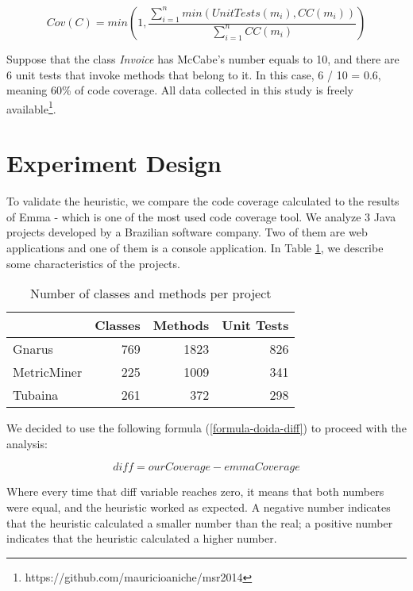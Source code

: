 \documentclass{sig-alternate}
\begin{document}
\begin{equation}
\label{formula-doida}
Cov(C) = min(1,\frac{\sum_{i=1}^{n}min(UnitTests(m_i), CC(m_i))}{\sum_{i=1}^{n}{CC(m_i)}})
\end{equation}

Suppose that the class \textit{Invoice} has McCabe's number equals to 10, 
and there are 6 unit tests that invoke methods that belong to it. 
In this case, 6 / 10 = 0.6, meaning  60\% of code coverage.
All data collected in this study is freely available\footnote{https://github.com/mauricioaniche/msr2014}.

\section{Experiment Design}
\label{sec-experiment}

To validate the heuristic, we compare the code coverage calculated to the results of Emma - which is one of the most used code coverage tool.
We analyze 3 Java projects developed by a Brazilian software company. Two of them are
web applications and one of them is a console application. In Table \ref{tab:projects}, we describe
some characteristics of the projects.

\begin{table}[h!]
\centering
\caption{Number of classes and methods per project}
\begin{tabular}{ | l | r | r | r | }
\hline
& Classes & Methods & Unit Tests\\ 
\hline
Gnarus & 769 & 1823 & 826\\ 
MetricMiner & 225 & 1009 & 341\\ 
Tubaina & 261 & 372 & 298\\ 

\hline
\end{tabular}
\label{tab:projects}
\end{table}

We decided to use the following formula (\ref{formula-doida-diff}) to proceed with the analysis:

\begin{equation}
\label{formula-doida-diff}
diff = ourCoverage - emmaCoverage
\end{equation}

Where every time that diff variable reaches zero, it means that both numbers
were equal, and the heuristic worked as expected. A negative number indicates that the heuristic calculated a smaller number than the real; a positive number indicates that the heuristic calculated a higher
number.
\end{document}
